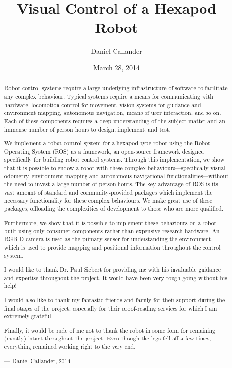 \documentclass{l4proj}
\begin{document}
\title{Visual Control of a Hexapod Robot}
\author{Daniel Callander}
\date{March 28, 2014}
\maketitle


\begin{abstract}
Robot control systems require a large underlying infrastructure of software to facilitate any complex behaviour. Typical systems require a means for communicating with hardware, locomotion control for movement, vision systems for guidance and environment mapping, autonomous navigation, means of user interaction, and so on. Each of these components requires a deep understanding of the subject matter and an immense number of person hours to design, implement, and test.

We implement a robot control system for a hexapod-type robot using the Robot Operating System (ROS) as a framework, an open-source framework designed specifically for building robot control systems. Through this implementation, we show that it is possible to endow a robot with these complex behaviours---specifically visual odometry, environment mapping and autonomous navigational functionalities---without the need to invest a large number of person hours. The key advantage of ROS is its vast amount of standard and community-provided packages which implement the necessary functionality for these complex behaviours. We make great use of these packages, offloading the complexities of development to those who are more qualified. 

Furthermore, we show that it is possible to implement these behaviours on a robot built using only consumer components rather than expensive research hardware. An RGB-D camera is used as the primary sensor for understanding the environment, which is used to provide mapping and positional information throughout the control system.
\end{abstract}

\renewcommand{\abstractname}{Acknowledgements}
\begin{abstract}
I would like to thank Dr. Paul Siebert for providing me with his invaluable guidance and expertise throughout the project. It would have been very tough going without his help! 

\noindent
I would also like to thank my fantastic friends and family for their support during the final stages of the project, especially for their proof-reading services for which I am extremely grateful.

\noindent
Finally, it would be rude of me not to thank the robot in some form for remaining (mostly) intact throughout the project. Even though the legs fell off a few times, everything remained working right to the very end.

--- Daniel Callander, 2014
\end{abstract}
\end{document}

